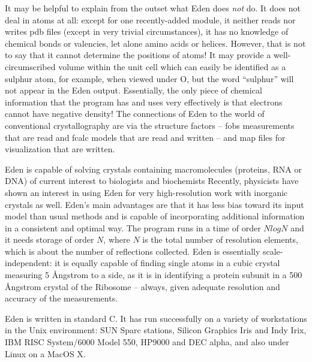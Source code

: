 \documentclass{report}
\begin{document}
\vspace {0.1in}

It may be helpful to explain from the outset what Eden does {\em not} do.  It
does not deal in atoms at all: except for one recently-added module,
it neither reads nor writes pdb files (except
in very trivial circumstances), it has no knowledge of chemical bonds or 
valencies, let alone amino acids or helices.  
However, that is not to say that it cannot determine the positions of atoms!
It may provide a well-circumscribed volume within the unit cell which can easily
be identified as a sulphur atom, for example, when viewed under O, but
the word ``sulphur'' will not appear in the Eden output.   Essentially,
the only piece of chemical information that the program has and uses very 
effectively is that electrons cannot have negative density!  
The connections of Eden to the world of conventional crystallography are 
via the structure factors -- fobs measurements that are read and fcalc 
models that are read and written -- and map files for visualization that are
written.

\vspace {0.1in}

Eden is capable of solving crystals containing macromolecules (proteins,
RNA or DNA) of current
interest to biologists and biochemists
Recently, physicists have shown an interest in
using Eden for very high-resolution work with inorganic crystals as well.
Eden's main advantages are that it has less bias toward
its input model than usual methods and is capable of incorporating
additional information in a consistent and optimal way.  The program runs 
in a time of order $ NlogN $ and it needs storage of order $ N $, where
$ N $ is the total number of resolution elements, which is about the
number of reflections collected.  Eden is essentially scale-independent: it is
equally capable of finding single atoms
in a cubic crystal measuring 5 \AA ngstrom to a side, as it is in identifying a 
protein subunit in a 500 \AA ngstrom crystal of the Ribosome -- always, 
given adequate resolution and accuracy of the measurements.

\vspace {0.1in}

Eden is written in standard C.  It has run successfully on
a variety of workstations in the Unix environment:
SUN Sparc stations, Silicon Graphics Iris and Indy Irix,
IBM RISC System/6000 Model 550, HP9000 and DEC alpha, and also
under Linux on a MacOS X.

\vspace {0.1in}
\end{document}
